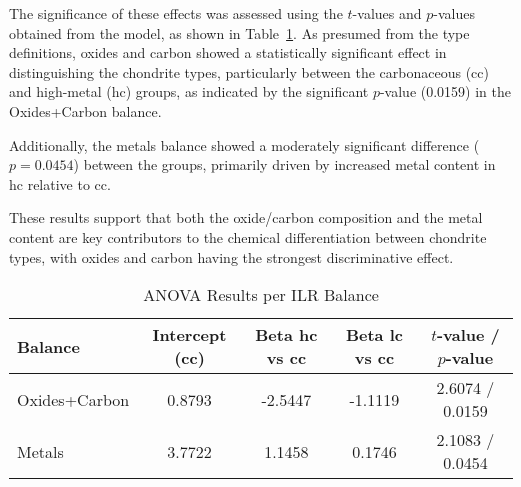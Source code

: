 The significance of these effects was assessed using the \( t \)-values and \( p \)-values obtained from the model, as shown in Table~\ref{tab:anova_ilr_results}. As presumed from the type definitions, oxides and carbon showed a statistically significant effect in distinguishing the chondrite types, particularly between the carbonaceous (cc) and high-metal (hc) groups, as indicated by the significant \( p \)-value (0.0159) in the Oxides+Carbon balance.

Additionally, the metals balance showed a moderately significant difference (\( p = 0.0454 \)) between the groups, primarily driven by increased metal content in hc relative to cc.

These results support that both the oxide/carbon composition and the metal content are key contributors to the chemical differentiation between chondrite types, with oxides and carbon having the strongest discriminative effect.

\begin{table}[H]
\centering
\caption{ANOVA Results per ILR Balance}
\label{tab:anova_ilr_results}
\begin{tabular}{lcccc}
\toprule
\textbf{Balance} & \textbf{Intercept (cc)} & \textbf{Beta hc vs cc} & \textbf{Beta lc vs cc} & \textbf{$t$-value / $p$-value} \\
\midrule
Oxides+Carbon & 0.8793 & -2.5447 & -1.1119 & 2.6074 / 0.0159 \\
Metals & 3.7722 & 1.1458  & 0.1746  & 2.1083 / 0.0454 \\
\bottomrule
\end{tabular}
\end{table}
